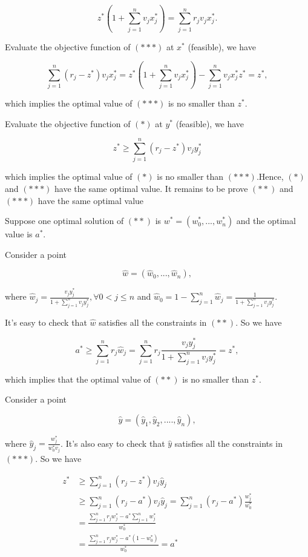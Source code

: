 \documentclass[11pt]{article}
\begin{document}
\[
z^*(1 + \sum_{j=1}^n v_jx_j^*) = \sum_{j=1}^n r_jv_jx_j^*.
\]

Evaluate the objective function of \((***)\) at \(x^*\) (feasible), we
have

\[
\sum_{j=1}^n(r_j-z^*)v_jx_j^* = z^*(1 + \sum_{j=1}^n v_jx_j^*) - \sum_{j=1}^n v_jx_j^*z^*=z^*,
\]

which implies the optimal value of \((***)\) is no smaller than \(z^*\).

Evaluate the objective function of \((*)\) at \(y^*\) (feasible), we
have

\[
z^* \geq \sum_{j=1}^n (r_j-z^*)v_jy_j^*
\]

which implies the optimal value of \((*)\) is no smaller than
\((***)\).Hence, \((*)\) and \((***)\) have the same optimal value. It
remains to be prove \((**)\) and \((***)\) have the same optimal value

Suppose one optimal solution of \((**)\) is \(w^*=(w_0^*,...,w_n^*)\)
and the optimal value is \(a^*\).

Consider a point

\[
\hat w= (\hat w_0,...,\hat w_n),
\]

where
\(\hat w_j=\frac{v_jy_j^*}{1 + \sum_{j=1}^n v_jy_j^*},\forall 0<j\leq n\)
and
\(\hat w_0 = 1 - \sum_{j=1}^n \hat w_j= \frac{1}{1 + \sum_{j=1}^n v_jy_j^*}\).

It's easy to check that \(\hat w\) satisfies all the constraints in
\((**)\). So we have

\[
a^* \geq \sum_{j=1}^n r_j\hat w_j = \sum_{j=1}^n r_j\frac{v_jy_j^*}{1 + \sum_{j=1}^n v_jy_j^*}=z^*,
\]

which implies that the optimal value of \((**)\) is no smaller than
\(z^*\).

Consider a point

\[
\hat y=(\hat y_1, \hat y_2, ...., \hat y_n),
\]

where \(\hat y_j = \frac{w_j^*}{w_0^*v_j}\). It's also easy to check
that \(\hat y\) satisfies all the constraints in \((***)\). So we have

\[
\begin{align}
z^* & \geq \sum_{j=1}^n (r_j-z^*)v_j\hat y_j\\
& \geq \sum_{j=1}^n (r_j-a^*)v_j\hat y_j = \sum_{j=1}^n (r_j-a^*)\frac{w_j^*}{w_0^*}\\
& = \frac{\sum_{j=1}^n r_j w_j^* - a^*\sum_{j=1}^n w_j^*}{w_0^*} \\
& = \frac{\sum_{j=1}^n r_j w_j^* - a^* (1- w_0^*)}{w_0^*} = a^*
\end{align}
\]
\end{document}
